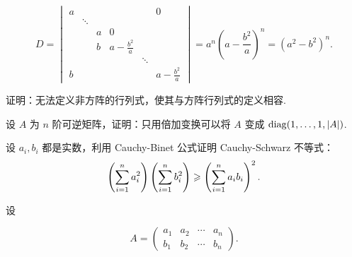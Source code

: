 \begin{exercise}
\begin{exgroup}
\begin{answer}
\begin{enumerate}
                    \[
                        D = \begin{vmatrix}
                            a &         &   &                   &         & 0                 \\
                              & \ddots  &   &                   &         &                   \\
                              &         & a & 0                 &         &                   \\
                              &         & b & a - \frac{b^2}{a} &         &                   \\
                              &         &   &                   & \ddots  &                   \\
                            b &         &   &                   &         & a - \frac{b^2}{a}
                        \end{vmatrix}
                        = a^n (a - \frac{b^2}{a})^n
                        = (a^2 - b^2)^n.
                    \]
            \end{enumerate}
        \end{answer}
    \end{exgroup}

    \begin{exgroup}
        \item 证明：无法定义非方阵的行列式，使其与方阵行列式的定义相容.
        \begin{answer}

        \end{answer}

        \item 设 $A$ 为 $n$ 阶可逆矩阵，证明：只用倍加变换可以将 $A$ 变成 $\operatorname{diag}(1,\ldots,1,|A|)$.
        \begin{answer}

        \end{answer}

        \item 设 $a_i, b_i$ 都是实数，利用 Cauchy-Binet 公式证明 Cauchy-Schwarz 不等式：
        \[
            \left( \sum_{i=1}^{n}\limits a_i^2 \right) \left( \sum_{i=1}^{n}\limits b_i^2 \right) \geqslant \left( \sum_{i=1}^{n}\limits a_i b_i \right)^2.
        \]
        \begin{answer}
            设

            \[
                A = \begin{pmatrix}
                    a_1 & a_2 & \cdots & a_n \\
                    b_1 & b_2 & \cdots & b_n
                \end{pmatrix}.
            \]


\end{answer}
\end{exgroup}
\end{exercise}
